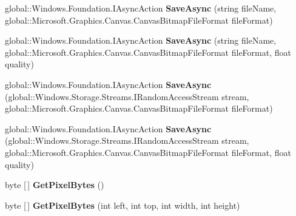 \begin{DoxyCompactItemize}
\item 
\mbox{\label{interface_microsoft_1_1_graphics_1_1_canvas_1_1_i_canvas_bitmap_aca107d6a479f4ea4b88f2265a278dedc}} 
global\+::\+Windows.\+Foundation.\+I\+Async\+Action {\bfseries Save\+Async} (string file\+Name, global\+::\+Microsoft.\+Graphics.\+Canvas.\+Canvas\+Bitmap\+File\+Format file\+Format)
\item 
\mbox{\label{interface_microsoft_1_1_graphics_1_1_canvas_1_1_i_canvas_bitmap_aa1b618fcc1333742a9cd060b9c7fdae5}} 
global\+::\+Windows.\+Foundation.\+I\+Async\+Action {\bfseries Save\+Async} (string file\+Name, global\+::\+Microsoft.\+Graphics.\+Canvas.\+Canvas\+Bitmap\+File\+Format file\+Format, float quality)
\item 
\mbox{\label{interface_microsoft_1_1_graphics_1_1_canvas_1_1_i_canvas_bitmap_a5dcf0ab30780f638bbfddc389d7b02db}} 
global\+::\+Windows.\+Foundation.\+I\+Async\+Action {\bfseries Save\+Async} (global\+::\+Windows.\+Storage.\+Streams.\+I\+Random\+Access\+Stream stream, global\+::\+Microsoft.\+Graphics.\+Canvas.\+Canvas\+Bitmap\+File\+Format file\+Format)
\item 
\mbox{\label{interface_microsoft_1_1_graphics_1_1_canvas_1_1_i_canvas_bitmap_afdef00bc9d9842506f809195ede3782f}} 
global\+::\+Windows.\+Foundation.\+I\+Async\+Action {\bfseries Save\+Async} (global\+::\+Windows.\+Storage.\+Streams.\+I\+Random\+Access\+Stream stream, global\+::\+Microsoft.\+Graphics.\+Canvas.\+Canvas\+Bitmap\+File\+Format file\+Format, float quality)
\item 
\mbox{\label{interface_microsoft_1_1_graphics_1_1_canvas_1_1_i_canvas_bitmap_ab71519e7f2009a2ac025f505eab45531}} 
byte \mbox{[}$\,$\mbox{]} {\bfseries Get\+Pixel\+Bytes} ()
\item 
\mbox{\label{interface_microsoft_1_1_graphics_1_1_canvas_1_1_i_canvas_bitmap_a41fdae7de41d057403b9f1a16ecff1d2}} 
byte \mbox{[}$\,$\mbox{]} {\bfseries Get\+Pixel\+Bytes} (int left, int top, int width, int height)

\end{DoxyCompactItemize}

